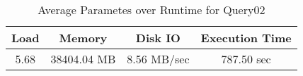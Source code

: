 \documentclass[../../main.tex]{subfiles}
\begin{document}
    \begin{table}
        \begin{center}
            \begin{tabular}{ |c|c|c|c| } 
            \hline
            Load & Memory & Disk IO & Execution Time\\
            \hline
            5.68 & 38404.04 MB & 8.56 MB/sec & 787.50 sec \\
            \hline
            \end{tabular}
            \\[1pt]
            \caption{Average Parametes over Runtime for Query02}
        \end{center}
    \end{table}
    \pagebreak
\end{document}
